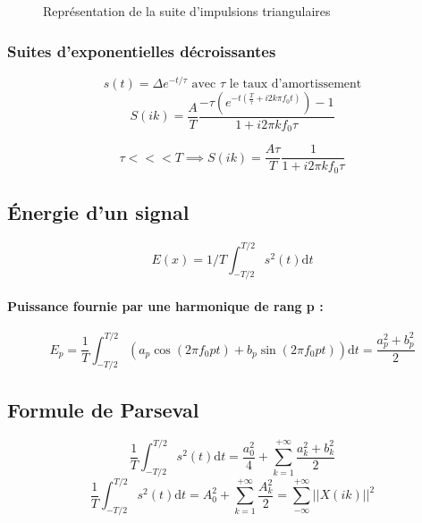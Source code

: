 \documentclass[a4paper,12pt]{report}
\begin{document}
\begin{figure}[!htbp]
	\centering
	\caption{Représentation de la suite d'impulsions triangulaires}
\end{figure}

\subsubsection{Suites d'exponentielles décroissantes}

\[ s(t) = \Delta e^{-t/\tau} \text{ avec } \tau \text{ le taux d'amortissement} \]
\[ S(ik) = \dfrac{A}{T} \dfrac{-\tau (e^{-t(\frac{T}{\tau}+i2k\pi f_0 t)})-1}{1+i2\pi kf_0 \tau} \]

 \[ \tau <<< T \implies S(ik) = \dfrac{A\tau}{T} \dfrac{1}{1+i2\pi kf_0 \tau} \]

\subsection{Énergie d'un signal}
\[ E(x) = 1/T \int_{-T/2}^{T/2} s^2(t) \mathrm{d}t \]

\paragraph{Puissance fournie par une harmonique de rang p :}
\[ E_p = \dfrac{1}{T} \int_{-T/2}^{T/2}(a_p \cos(2\pi f_0 pt) + b_p \sin(2\pi f_0 pt)) \mathrm{d}t = \dfrac{a_p^2 + b_p^2}{2} \]

\subsection{Formule de Parseval}

\begin{defi}
    \[ \dfrac{1}{T} \int_{-T/2}^{T/2} s^2(t) \mathrm{d}t = \dfrac{a_0^2}{4} + \sum_{k=1}^{+\infty} \dfrac{a_k^2 + b_k^2}{2} \]
    \[ \dfrac{1}{T} \int_{-T/2}^{T/2} s^2(t) \mathrm{d}t = A_0^2 + \sum_{k=1}^{+\infty} \dfrac{A_k^2}{2} = \sum_{-\infty}^{+\infty} ||X(ik)||^2 \]
\end{defi}
\end{document}
